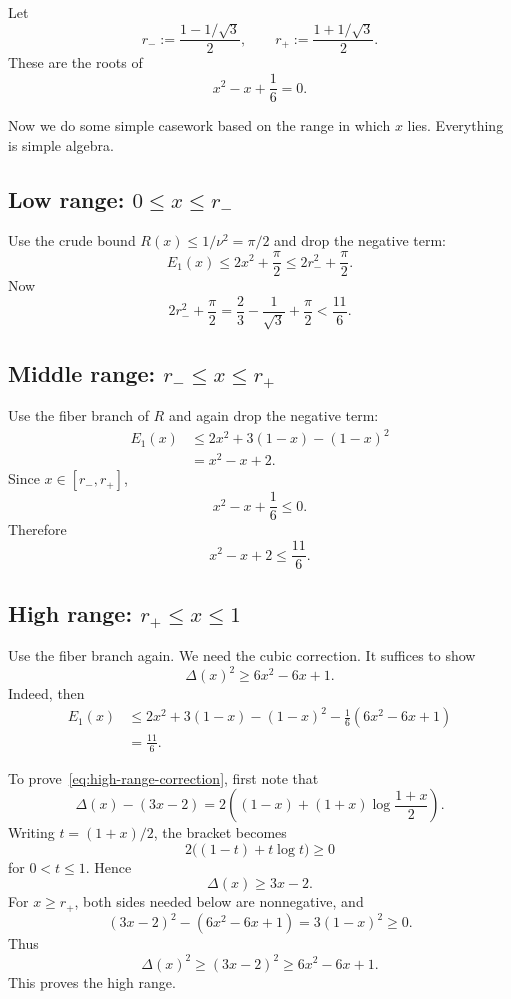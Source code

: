\documentclass[11pt]{article}
\numberwithin{equation}{section}
\begin{document}
Let
\[
        r_-:=\frac{1-1/\sqrt3}{2},
        \qquad
        r_+:=\frac{1+1/\sqrt3}{2}.
\]
These are the roots of
\[
        x^2-x+\frac16=0.
\]

Now we do some simple casework based on the range in which $x$ lies. Everything is simple algebra.

\subsection*{Low range: $0\le x\le r_-$}

Use the crude bound $R(x)\le 1/\nu^2=\pi/2$ and drop the negative term:
\[
        E_1(x)\le 2x^2+\frac\pi2
        \le 2r_-^2+\frac\pi2.
\]
Now
\[
        2r_-^2+\frac\pi2
        =\frac23-\frac1{\sqrt3}+\frac\pi2
        <\frac{11}{6}.
\]

\subsection*{Middle range: $r_-\le x\le r_+$}

Use the fiber branch of $R$ and again drop the negative term:
\begin{align*}
        E_1(x)
        &\le 2x^2+3(1-x)-(1-x)^2\\
        &=x^2-x+2.
\end{align*}
Since $x\in[r_-,r_+]$,
\[
        x^2-x+\frac16\le0.
\]
Therefore
\[
        x^2-x+2\le \frac{11}{6}.
\]

\subsection*{High range: $r_+\le x\le1$}

Use the fiber branch again. We need the cubic correction.
It suffices to show
\begin{equation}
        \Delta(x)^2\ge 6x^2-6x+1.
        \label{eq:high-range-correction}
\end{equation}
Indeed, then
\begin{align*}
        E_1(x)
        &\le 2x^2+3(1-x)-(1-x)^2-\frac16(6x^2-6x+1)\\
        &=\frac{11}{6}.
\end{align*}

To prove~\eqref{eq:high-range-correction}, first note that
\[
        \Delta(x)-(3x-2)
        =2\left((1-x)+(1+x)\log\frac{1+x}{2}\right).
\]
Writing $t=(1+x)/2$, the bracket becomes
\[
        2\bigl((1-t)+t\log t\bigr)\ge0
\]
for $0<t\le1$. Hence
\[
        \Delta(x)\ge 3x-2.
\]
For $x\ge r_+$, both sides needed below are nonnegative, and
\[
        (3x-2)^2-(6x^2-6x+1)=3(1-x)^2\ge0.
\]
Thus
\[
        \Delta(x)^2\ge (3x-2)^2\ge 6x^2-6x+1.
\]
This proves the high range.
\end{document}
